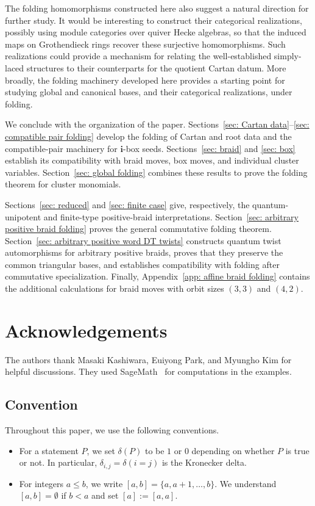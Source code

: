 \documentclass[12pt, leqno]{amsart}
\numberwithin{equation}{section}
\theoremstyle{plain}
\theoremstyle{definition}
\renewcommand{\le}{\leqslant}
\newcommand{\seteq}{\mathbin{:=}}
\newcommand{\bfi}{\mathbf{i}}
\newcommand{\bitem}{\begin{itemize}}
\newcommand{\eitem}{\end{itemize}}
\begin{document}
The folding homomorphisms constructed here also suggest a natural
direction for further study. It would be interesting to construct
their categorical realizations, possibly using module categories over
quiver Hecke algebras, so that the induced maps on Grothendieck rings
recover these surjective homomorphisms. Such realizations could provide
a mechanism for relating the well-established simply-laced structures
to their counterparts for the quotient Cartan datum. More broadly, the
folding machinery developed here provides a starting point for studying
  global and canonical{} bases, and their categorical realizations, under
folding.

\smallskip

We conclude with the organization of the paper.
Sections~\ref{sec: Cartan data}--\ref{sec: compatible pair folding}
develop the folding of Cartan and root data and the compatible-pair
machinery for $\bfi$-box seeds. Sections~\ref{sec: braid} and
\ref{sec: box} establish its compatibility with braid moves, box
moves, and individual cluster variables.
 Section~\ref{sec: global folding} combines these results to prove
the folding theorem for cluster monomials.

Sections~\ref{sec: reduced} and \ref{sec: finite case} give,
respectively, the quantum-unipotent and finite-type positive-braid
interpretations. Section~\ref{sec: arbitrary positive braid folding}
proves the general commutative folding theorem. 
Section~\ref{sec: arbitrary positive word DT twists} constructs
quantum twist automorphisms for arbitrary positive braids, proves
that they preserve the common triangular bases, and establishes
compatibility with folding after commutative specialization.
Finally,
Appendix~\ref{app: affine braid folding} contains the additional
  calculations for braid moves with orbit sizes $(3,3)$ and $(4,2)$. 

\section*{Acknowledgements}

The authors thank Masaki Kashiwara, Euiyong Park, and Myungho Kim
for helpful discussions. They used SageMath~\cite{SageMath}
for computations in the examples. 


\subsection*{Convention}
Throughout this paper, we use the following conventions.
\bitem
\item For a statement $P$, we set $\delta(P)$ to be $1$ or $0$ depending on whether $P$ is true or not. In particular, $\delta_{i,j}=\delta(i =j)$
is the Kronecker delta.
\item For integers $a\le b$, we write $[a,b]=\{a,a+1,\ldots,b\}$.
We understand $[a,b] = \emptyset$ if $b<a$ and set $[a]\seteq [a,a]$.
\eitem
\end{document}

